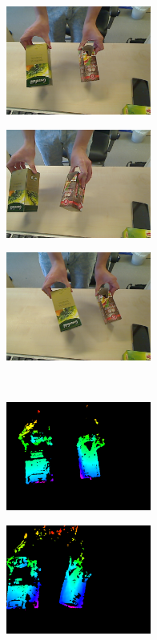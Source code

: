\begin{figure}[tbh]
\centering
\begin{subfigure}[b]{.32\linewidth}
	\centering
	\includegraphics[width=135pt]{figures/left_93.png}
  \end{subfigure}
\begin{subfigure}[b]{.32\linewidth}
	\centering
	\includegraphics[width=135pt]{figures/left_153.png}
  \end{subfigure}
\begin{subfigure}[b]{.32\linewidth}
	\centering
	\includegraphics[width=135pt]{figures/left_223.png}
  \end{subfigure}\\\vspace{5pt}
\begin{subfigure}[b]{.32\linewidth}
	\centering
	\includegraphics[width=135pt]{figures/vis_93.png}
  \end{subfigure}
\begin{subfigure}[b]{.32\linewidth}
	\centering
	\includegraphics[width=135pt]{figures/vis_153.png}

\end{subfigure}
\end{figure}
